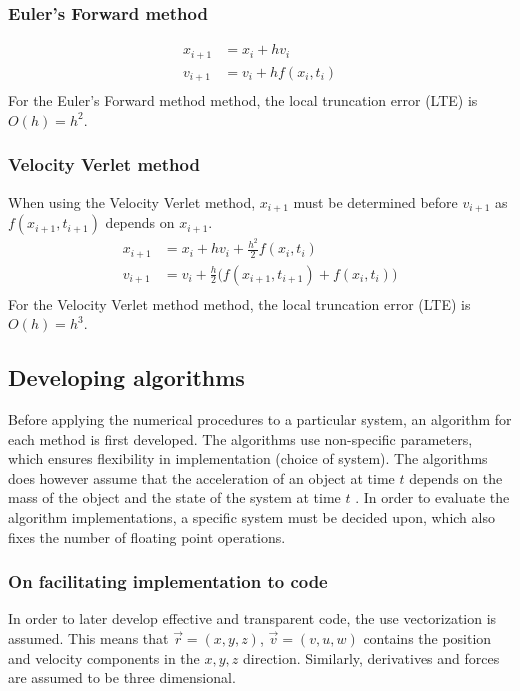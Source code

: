 \documentclass[%
oneside,                 %
final,                   %
10pt]{article}
\begin{document}
\subsubsection{Euler’s Forward method}
\begin{align*}
x_{i+1}&=x_i+hv_{i}\\
v_{i+1}&=v_{i}+hf(x_i,t_i)\\
\end{align*}
For the Euler's Forward method method, the local truncation error (LTE) is $O(h)=h^2$.
\newline
\subsubsection{Velocity Verlet method}
When using the Velocity Verlet method, $x_{i+1}$ must be determined before $v_{i+1}$ as $f(x_{i+1},t_{i+1})$ depends on $x_{i+1}$.
\begin{align*}
x_{i+1}&=x_i+hv_{i}+\frac{h^2}{2}f(x_i,t_i) \\
v_{i+1}&=v_{i}+\frac{h}{2} \big(f(x_{i+1},t_{i+1})+f(x_i,t_i) \big) \\
\end{align*}
For the Velocity Verlet method method, the local truncation error (LTE) is $O(h)=h^3$.


\subsection{Developing algorithms}
\label{sec:NPalgo}
Before applying the numerical procedures to a particular system, an algorithm for each method is first developed. The algorithms use non-specific parameters, which ensures flexibility in implementation (choice of system). The algorithms does however assume that the acceleration of an object at time $t$ depends on the mass of the object and the state of the system at time $t$ . \newline 
In order to evaluate the algorithm implementations, a specific system must be decided upon, which also fixes the number of floating point operations.  

\subsubsection*{On facilitating implementation to code}
In order to later develop effective and transparent code, the use vectorization is assumed. This means that $\vec{r}=(x,y,z)$, $\vec{v}=(v,u,w)$ contains the position and velocity components in the $x,y,z$ direction. Similarly, derivatives and forces are assumed to be three dimensional.  \newline
\end{document}
